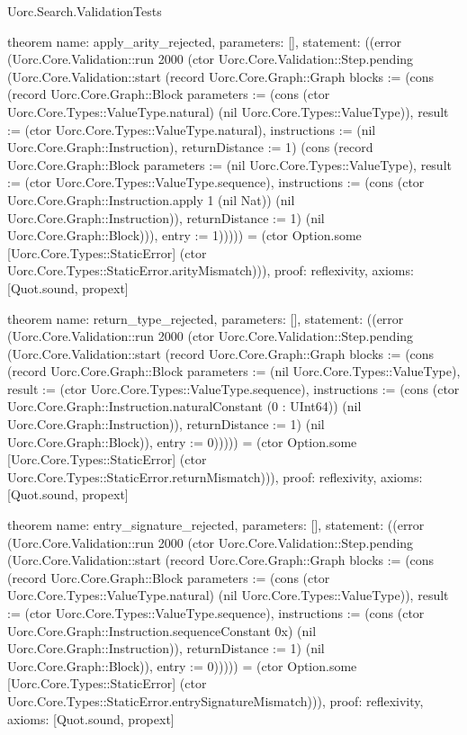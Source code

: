 \begin{lexlean}{Uorc.Search.ValidationTests}
\begin{semanticmodule}
theorem{
  name: apply_arity_rejected,
  parameters: [],
  statement: ((error (Uorc.Core.Validation::run 2000 (ctor Uorc.Core.Validation::Step.pending (Uorc.Core.Validation::start (record Uorc.Core.Graph::Graph {blocks := (cons (record Uorc.Core.Graph::Block {parameters := (cons (ctor Uorc.Core.Types::ValueType.natural) (nil Uorc.Core.Types::ValueType)), result := (ctor Uorc.Core.Types::ValueType.natural), instructions := (nil Uorc.Core.Graph::Instruction), returnDistance := 1}) (cons (record Uorc.Core.Graph::Block {parameters := (nil Uorc.Core.Types::ValueType), result := (ctor Uorc.Core.Types::ValueType.sequence), instructions := (cons (ctor Uorc.Core.Graph::Instruction.apply 1 (nil Nat)) (nil Uorc.Core.Graph::Instruction)), returnDistance := 1}) (nil Uorc.Core.Graph::Block))), entry := 1}))))) = (ctor Option.some [Uorc.Core.Types::StaticError] (ctor Uorc.Core.Types::StaticError.arityMismatch))),
  proof: reflexivity{},
  axioms: [Quot.sound, propext]
}

theorem{
  name: return_type_rejected,
  parameters: [],
  statement: ((error (Uorc.Core.Validation::run 2000 (ctor Uorc.Core.Validation::Step.pending (Uorc.Core.Validation::start (record Uorc.Core.Graph::Graph {blocks := (cons (record Uorc.Core.Graph::Block {parameters := (nil Uorc.Core.Types::ValueType), result := (ctor Uorc.Core.Types::ValueType.sequence), instructions := (cons (ctor Uorc.Core.Graph::Instruction.naturalConstant (0 : UInt64)) (nil Uorc.Core.Graph::Instruction)), returnDistance := 1}) (nil Uorc.Core.Graph::Block)), entry := 0}))))) = (ctor Option.some [Uorc.Core.Types::StaticError] (ctor Uorc.Core.Types::StaticError.returnMismatch))),
  proof: reflexivity{},
  axioms: [Quot.sound, propext]
}

theorem{
  name: entry_signature_rejected,
  parameters: [],
  statement: ((error (Uorc.Core.Validation::run 2000 (ctor Uorc.Core.Validation::Step.pending (Uorc.Core.Validation::start (record Uorc.Core.Graph::Graph {blocks := (cons (record Uorc.Core.Graph::Block {parameters := (cons (ctor Uorc.Core.Types::ValueType.natural) (nil Uorc.Core.Types::ValueType)), result := (ctor Uorc.Core.Types::ValueType.sequence), instructions := (cons (ctor Uorc.Core.Graph::Instruction.sequenceConstant 0x) (nil Uorc.Core.Graph::Instruction)), returnDistance := 1}) (nil Uorc.Core.Graph::Block)), entry := 0}))))) = (ctor Option.some [Uorc.Core.Types::StaticError] (ctor Uorc.Core.Types::StaticError.entrySignatureMismatch))),
  proof: reflexivity{},
  axioms: [Quot.sound, propext]
}


\end{semanticmodule}
\end{lexlean}
